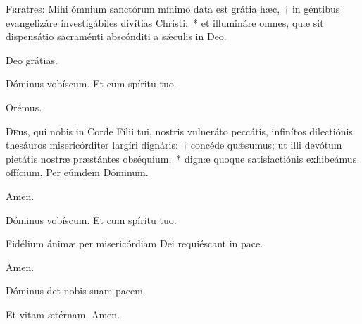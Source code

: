 


\lettrine{F}{r}ratres: Mihi ómnium sanctórum mínimo data est grátia hæc,~† in géntibus evangelizáre investigábiles divítias Christi:~* et illumináre omnes, quæ sit dispensátio sacraménti abscónditi a sǽculis in Deo.

\rr Deo grátias.

\hymnus
   

   \admagnificat
   
    
    
  
  
  \vv Dóminus vobíscum. \rr Et cum spíritu tuo.
  
  \oratio
  
  Orémus.
  
  \lettrine{D}{e}us, qui nobis in Corde Fílii tui, nostris vulneráto peccátis, infinítos dilectiónis thesáuros misericórditer largíri dignáris:~† concéde quǽsumus; ut illi devótum pietátis nostræ præstántes obséquium,~* dignæ quoque satisfactiónis exhibeámus offícium. Per eúmdem Dóminum.
  
  \rr Amen.

   \vv Dóminus vobíscum. \rr Et cum spíritu tuo.
   
   
  \vv Fidélium ánimæ per misericórdiam Dei requiéscant in pace.
  
  \rr Amen.
  
  
  \secreto
  
\vv Dóminus det nobis suam pacem.
  
\rr Et vitam ætérnam. Amen.

